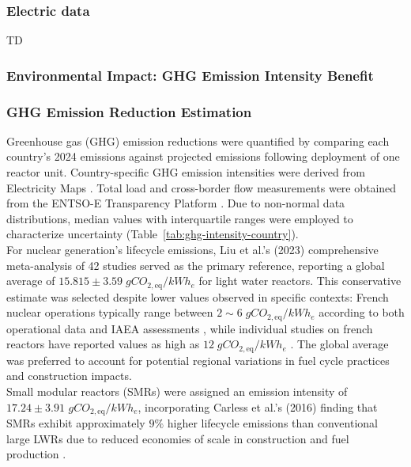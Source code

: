 \subsubsection{Electric data}
TD

\subsubsection{Environmental Impact: GHG Emission Intensity Benefit}

\subsubsection{GHG Emission Reduction Estimation}
Greenhouse gas (GHG) emission reductions were quantified by comparing each country's 2024 emissions against projected emissions following deployment of one reactor unit. Country-specific GHG emission intensities were derived from Electricity Maps \cite{ElectricityMaps_CarbonIntensity_2024}. Total load and cross-border flow measurements were obtained from the ENTSO-E Transparency Platform \cite{ENTSOE_Transparency_2025}. Due to non-normal data distributions, median values with interquartile ranges were employed to characterize uncertainty (Table~\ref{tab:ghg-intensity-country}). \\

For nuclear generation's lifecycle emissions, Liu et al.'s (2023) comprehensive meta-analysis of 42 studies \cite{10.3389/fenrg.2023.1147016} served as the primary reference, reporting a global average of $15.815 \pm 3.59 \; gCO_{2,\text{eq}}/kWh_e$ for light water reactors. This conservative estimate was selected despite lower values observed in specific contexts: French nuclear operations typically range between $ 2 \sim 6 \; gCO_{2,\text{eq}}/kWh_e$ according to both operational data \cite{paillere_2021} and IAEA assessments \cite{IAEA_Climate_Change_Nuclear_Power_2022}, while individual studies on french reactors have reported values as high as $12 \; gCO_{2,\text{eq}}/kWh_e$ \cite{paillere_2021}. The global average was preferred to account for potential regional variations in fuel cycle practices and construction impacts. \\

Small modular reactors (SMRs) were assigned an emission intensity of $17.24 \pm 3.91$ $gCO_{2,\text{eq}}/kWh_e$, incorporating Carless et al.'s (2016) finding that SMRs exhibit approximately $9\%$ higher lifecycle emissions than conventional large LWRs due to reduced economies of scale in construction and fuel production \cite{CARLESS201684}. \\

